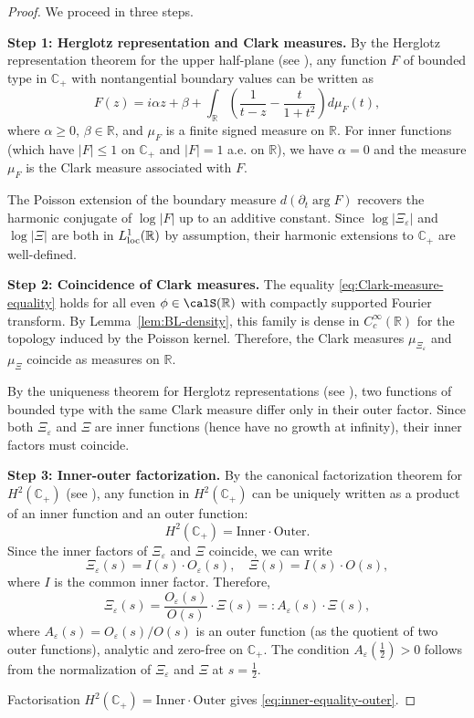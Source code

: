 ﻿\documentclass[12pt,a4paper]{article}
\theoremstyle{definition}
\theoremstyle{remark}
\newcommand{\CC}{\mathbb{C}}
\newcommand{\RR}{\mathbb{R}}
\begin{document}
\begin{proof}
We proceed in three steps.

\textbf{Step 1: Herglotz representation and Clark measures.}
By the Herglotz representation theorem for the upper half-plane (see \cite[Thm.~11.9]{RudinRCA}), any function $F$ of bounded type in $\CC_+$ with nontangential boundary values can be written as
\[
  F(z) = i\alpha z + \beta + \int_\RR \left(\frac{1}{t-z} - \frac{t}{1+t^2}\right) d\mu_F(t),
\]
where $\alpha \geq 0$, $\beta \in \RR$, and $\mu_F$ is a finite signed measure on $\RR$. For inner functions (which have $|F| \leq 1$ on $\CC_+$ and $|F| = 1$ a.e. on $\RR$), we have $\alpha = 0$ and the measure $\mu_F$ is the Clark measure associated with $F$.

The Poisson extension of the boundary measure $d(\partial_t\arg F)$ recovers the harmonic conjugate of $\log|F|$ up to an additive constant. Since $\log|\Xi_\varepsilon|$ and $\log|\Xi|$ are both in $L^1_{\rm loc}(\RR)$ by assumption, their harmonic extensions to $\CC_+$ are well-defined.

\textbf{Step 2: Coincidence of Clark measures.}
The equality \eqref{eq:Clark-measure-equality} holds for all even $\phi\in\calS(\RR)$ with compactly supported Fourier transform. By Lemma~\ref{lem:BL-density}, this family is dense in $C_c^\infty(\RR)$ for the topology induced by the Poisson kernel. Therefore, the Clark measures $\mu_{\Xi_\varepsilon}$ and $\mu_\Xi$ coincide as measures on $\RR$.

By the uniqueness theorem for Herglotz representations (see \cite[Cor.~11.10]{RudinRCA}), two functions of bounded type with the same Clark measure differ only in their outer factor. Since both $\Xi_\varepsilon$ and $\Xi$ are inner functions (hence have no growth at infinity), their inner factors must coincide.

\textbf{Step 3: Inner-outer factorization.}
By the canonical factorization theorem for $H^2(\CC_+)$ (see \cite[Thm.~2.11]{Garnett2007}), any function in $H^2(\CC_+)$ can be uniquely written as a product of an inner function and an outer function:
\[
  H^2(\CC_+) = \mathrm{Inner} \cdot \mathrm{Outer}.
\]
Since the inner factors of $\Xi_\varepsilon$ and $\Xi$ coincide, we can write
\[
  \Xi_\varepsilon(s) = I(s) \cdot O_\varepsilon(s), \quad \Xi(s) = I(s) \cdot O(s),
\]
where $I$ is the common inner factor. Therefore,
\[
  \Xi_\varepsilon(s) = \frac{O_\varepsilon(s)}{O(s)} \cdot \Xi(s) =: A_\varepsilon(s) \cdot \Xi(s),
\]
where $A_\varepsilon(s) = O_\varepsilon(s)/O(s)$ is an outer function (as the quotient of two outer functions), analytic and zero-free on $\CC_+$. The condition $A_\varepsilon(\tfrac12) > 0$ follows from the normalization of $\Xi_\varepsilon$ and $\Xi$ at $s = \tfrac12$.

Factorisation $H^2(\CC_+)=\mathrm{Inner}\cdot \mathrm{Outer}$ gives \eqref{eq:inner-equality-outer}.
\end{proof}
\end{document}
